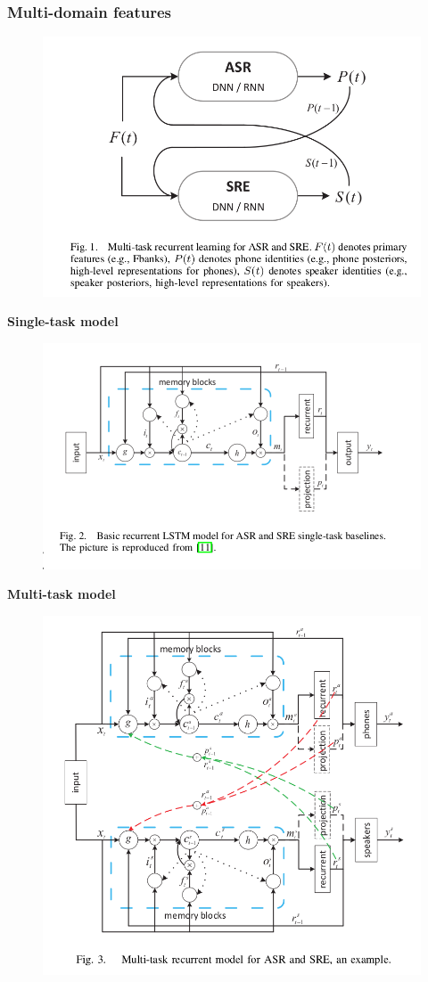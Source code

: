 \documentclass{article}
\begin{document}
	\subsubsection{Multi-domain features}
	\begin{figure}[H]
		\centering
		\includegraphics[width=0.75\linewidth]{images/multi-task-recurrent-learning.png}
		\label{fig:writing-thesis}
	\end{figure}
	\textbf{Single-task model}
	\begin{figure}[H]
		\centering
		\includegraphics[width=0.75\linewidth]{images/basis-single-task-model.png}
		\label{fig:writing-thesis}
	\end{figure}
	\textbf{Multi-task model}
	\begin{figure}[H]
		\centering
		\includegraphics[width=0.75\linewidth]{images/multi-task-recurrent-model.png}
		\label{fig:writing-thesis}
	\end{figure}
	
\end{document}
